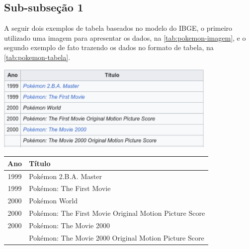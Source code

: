 \subsection[Sub-subseção 1]{Sub-subseção 1}\label{subsec:introducao-subsubsecao1}
    \lipsum[1]

    A seguir dois exemplos de tabela baseados no modelo do IBGE, o primeiro utilizado uma imagem para apresentar os dados, na \autoref{tab:pokemon-imagem}, e o segundo exemplo de fato trazendo os dados no formato de tabela, na \autoref{tab:pokemon-tabela}.
    \begin{table}[htb]
        {%
            \includegraphics[width=0.8\textwidth,keepaspectratio]{img/01-introducao/pokemon.pdf}
        }
        {%
        }
    \end{table}

    \begin{table}[htb]
        {%
            \begin{tabular}{cl}
                \toprule
                \textbf{Ano}    & \textbf{Título}                                           \\
                \midrule\midrule
                1999            & Pokémon 2.B.A. Master                                     \\
                1999            & Pokémon: The First Movie                                  \\
                2000            & Pokémon World                                             \\
                2000            & Pokémon: The First Movie Original Motion Picture Score    \\
                2000            & Pokémon: The Movie 2000                                   \\
                                & Pokémon: The Movie 2000 Original Motion Picture Score     \\
                \bottomrule
            \end{tabular}
        }
        {%
        }
    \end{table}


